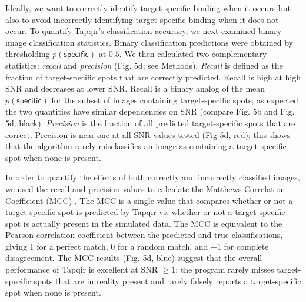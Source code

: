

Ideally, we want to correctly identify target-specific binding when it occurs but also to avoid incorrectly identifying target-specific binding when it does not occur. To quantify Tapqir's classification accuracy, we next examined binary image classification statistics. Binary classification predictions were obtained by thresholding $p(\mathsf{specific})$ at $0.5$. We then calculated two complementary statistics: \textit{recall} and \textit{precision} \cite{Fawcett2006-bq} (Fig. 5d; see Methods). \textit{Recall} is defined as the fraction of target-specific spots that are correctly predicted. Recall is high at high SNR and decreases at lower SNR. Recall is a binary analog of the mean $p(\mathsf{specific})$ for the subset of images containing target-specific spots; as expected the two quantities have similar dependencies on SNR (compare Fig. 5b and Fig. 5d, black). \textit{Precision} is the fraction of all predicted target-specific spots that are correct. Precision is near one at all SNR values tested (Fig 5d, red); this shows that the algorithm rarely misclassifies an image as containing a target-specific spot when none is present. 

In order to quantify the effects of both correctly and incorrectly classified images, we used the recall and precision values to calculate the Matthews Correlation Coefficient (MCC) \cite{Matthews1975-rw}. The MCC is a single value that compares whether or not a target-specific spot is predicted by Tapqir vs. whether or not a target-specific spot is actually present in the simulated data. The MCC is equivalent to the Pearson correlation coefficient between the predicted and true classifications, giving 1 for a perfect match, 0 for a random match, and $-1$ for complete disagreement. The MCC results (Fig. 5d, blue) suggest that the overall performance of Tapqir is excellent at SNR $\ge 1$: the program rarely misses target-specific spots that are in reality present and rarely falsely reports a target-specific spot when none is present.  

